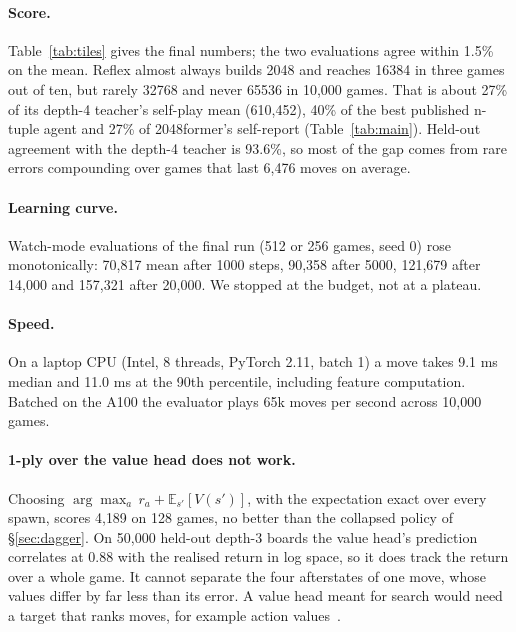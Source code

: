 \documentclass{article}
\newcommand{\method}{Reflex}
\begin{document}
\paragraph{Score.}
Table~\ref{tab:tiles} gives the final numbers; the two evaluations agree within 1.5\% on the mean.
\method{} almost always builds 2048 and reaches 16384 in three games out of ten, but rarely 32768 and never 65536 in 10{,}000 games.
That is about 27\% of its depth-4 teacher's self-play mean (610{,}452), 40\% of the best published n-tuple agent and 27\% of 2048former's self-report (Table~\ref{tab:main}).
Held-out agreement with the depth-4 teacher is 93.6\%, so most of the gap comes from rare errors compounding over games that last 6{,}476 moves on average.

\paragraph{Learning curve.}
Watch-mode evaluations of the final run (512 or 256 games, seed 0) rose monotonically: 70{,}817 mean after 1000 steps, 90{,}358 after 5000, 121{,}679 after 14{,}000 and 157{,}321 after 20{,}000.
We stopped at the budget, not at a plateau.

\paragraph{Speed.}
On a laptop CPU (Intel, 8 threads, PyTorch 2.11, batch 1) a move takes 9.1 ms median and 11.0 ms at the 90th percentile, including feature computation.
Batched on the A100 the evaluator plays 65k moves per second across 10{,}000 games.

\paragraph{1-ply over the value head does not work.}
Choosing $\arg\max_a\, r_a + \mathbb{E}_{s'}[V(s')]$, with the expectation exact over every spawn, scores 4{,}189 on 128 games, no better than the collapsed policy of \S\ref{sec:dagger}.
On 50{,}000 held-out depth-3 boards the value head's prediction correlates at 0.88 with the realised return in log space, so it does track the return over a whole game.
It cannot separate the four afterstates of one move, whose values differ by far less than its error.
A value head meant for search would need a target that ranks moves, for example action values~\citep{ruoss2024amortized}.
\end{document}
